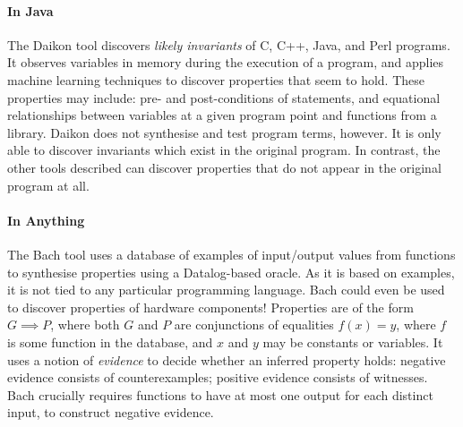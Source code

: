 \paragraph{In Java}
The Daikon\cite{ernst2007} tool discovers \emph{likely invariants} of
C, C++, Java, and Perl programs.  It observes variables in memory
during the execution of a program, and applies machine learning
techniques to discover properties that seem to hold.  These properties
may include: pre- and post-conditions of statements, and equational
relationships between variables at a given program point and functions
from a library.  Daikon does not synthesise and test program terms,
however.  It is only able to discover invariants which exist in the
original program.  In contrast, the other tools described can discover
properties that do not appear in the original program at all.

\paragraph{In Anything}
The Bach\cite{smith2017} tool uses a database of examples of
input/output values from functions to synthesise properties using a
Datalog-based oracle.  As it is based on examples, it is not tied to
any particular programming language.  Bach could even be used to
discover properties of hardware components!  Properties are of the
form $G \implies P$, where both $G$ and $P$ are conjunctions of
equalities $f(x) = y$, where $f$ is some function in the database, and
$x$ and $y$ may be constants or variables.  It uses a notion of
\emph{evidence} to decide whether an inferred property holds: negative
evidence consists of counterexamples; positive evidence consists of
witnesses.  Bach crucially requires functions to have at most one
output for each distinct input, to construct negative evidence.
